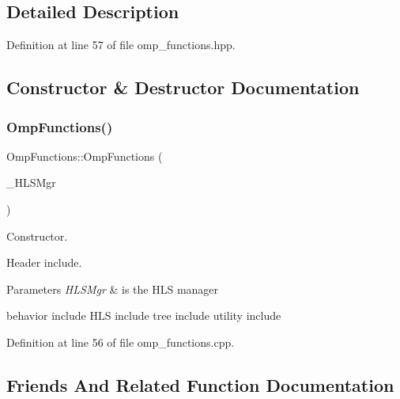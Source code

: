 \subsection{Detailed Description}


Definition at line 57 of file omp\+\_\+functions.\+hpp.



\subsection{Constructor \& Destructor Documentation}
\mbox{\label{classOmpFunctions_af328270d7b437c8e57f08d4fb2a7410f}} 
\subsubsection{\texorpdfstring{Omp\+Functions()}{OmpFunctions()}}
{\footnotesize\ttfamily Omp\+Functions\+::\+Omp\+Functions (\begin{DoxyParamCaption}\item[{const \hyperlink{hls__manager_8hpp_a1b481383e3beabc89bd7562ae672dd8c}{H\+L\+S\+\_\+manager\+Const\+Ref}}]{\+\_\+\+H\+L\+S\+Mgr }\end{DoxyParamCaption})\hspace{0.3cm}{\ttfamily [explicit]}}



Constructor. 

Header include.


\begin{DoxyParams}{Parameters}
{\em H\+L\+S\+Mgr} & is the H\+LS manager\\
\hline
\end{DoxyParams}
behavior include H\+LS include tree include utility include 

Definition at line 56 of file omp\+\_\+functions.\+cpp.



\subsection{Friends And Related Function Documentation}
\mbox{\label{classOmpFunctions_a364f56c8c8c4a93767162e57841f4b79}} 
